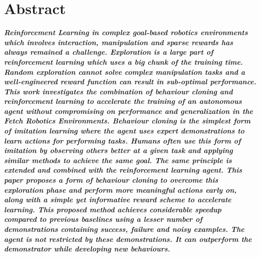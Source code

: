 \thispagestyle{acknowledgements}
\section*{Abstract}

\textbf{\textit{Reinforcement Learning in complex goal-based robotics environments which involves interaction, manipulation and sparse rewards has always remained a challenge. Exploration is a large part of reinforcement learning which uses a big chunk of the training time. Random exploration cannot solve complex manipulation tasks and a well-engineered reward function can result in sub-optimal performance. This work investigates the combination of behaviour cloning and reinforcement learning to accelerate the training of an autonomous agent without compromising on performance and generalization in the Fetch Robotics Environments. Behaviour cloning is the simplest form of imitation learning where the agent uses expert demonstrations to learn actions for performing tasks. Humans often use this form of imitation by observing others better at a given task and applying similar methods to achieve the same goal. The same principle is extended and combined with the reinforcement learning agent. This paper proposes a form of behaviour cloning to overcome this exploration phase and perform more meaningful actions early on, along with a simple yet informative reward scheme to accelerate learning. This proposed method achieves considerable speedup compared to previous baselines using a lesser number of demonstrations containing success, failure and noisy examples. The agent is not restricted by these demonstrations. It can outperform the demonstrator while developing new behaviours.}}
